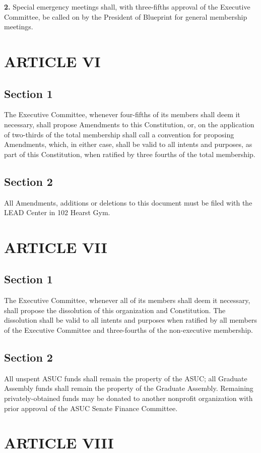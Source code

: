 \documentclass{article}
\begin{document}
\textbf{2.} Special emergency meetings shall, with three-fifths approval of the Executive Committee, be called on by the President of Blueprint for general membership meetings.

\section{ARTICLE VI}
\subsection{Section 1}
The Executive Committee, whenever four-fifths of its members shall deem it necessary, shall propose Amendments to this Constitution, or, on the application of two-thirds of the total membership shall call a convention for proposing Amendments, which, in either case, shall be valid to all intents and purposes, as part of this Constitution, when ratified by three fourths of the total membership.

\subsection{Section 2}
All Amendments, additions or deletions to this document must be filed with the LEAD Center in 102 Hearst Gym.

\section{ARTICLE VII}
\subsection{Section 1}
The Executive Committee, whenever all of its members shall deem it necessary, shall propose the dissolution of this organization and Constitution. The dissolution shall be valid to all intents and purposes when ratified by all members of the Executive Committee and three-fourths of the non-executive membership.

\subsection{Section 2}
All unspent ASUC funds shall remain the property of the ASUC; all Graduate Assembly funds shall remain the property of the Graduate Assembly. Remaining privately-obtained funds may be donated to another nonprofit organization with prior approval of the ASUC Senate Finance Committee.

\section{ARTICLE VIII}
\end{document}
